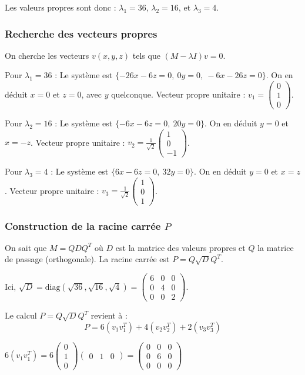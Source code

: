 \documentclass[french]{yLectureNote}
\begin{document}
Les valeurs propres sont donc : $\lambda_1 = 36$, $\lambda_2 = 16$, et $\lambda_3 = 4$.

 \subsubsection{Recherche des vecteurs propres}
On cherche les vecteurs $v(x, y, z)$ tels que $(M - \lambda I)v = 0$.

   Pour $\lambda_1 = 36$ :
    Le système est $\{-26x - 6z = 0, \ 0y = 0, \ -6x - 26z = 0\}$. On en déduit $x=0$ et $z=0$, avec $y$ quelconque.
    Vecteur propre unitaire : $v_1 = \begin{pmatrix} 0 \\ 1 \\ 0 \end{pmatrix}$.

   Pour $\lambda_2 = 16$ :
    Le système est $\{-6x - 6z = 0, \ 20y = 0\}$. On en déduit $y=0$ et $x = -z$.
    Vecteur propre unitaire : $v_2 = \frac{1}{\sqrt{2}} \begin{pmatrix} 1 \\ 0 \\ -1 \end{pmatrix}$.

   Pour $\lambda_3 = 4$ :
    Le système est $\{6x - 6z = 0, \ 32y = 0\}$. On en déduit $y=0$ et $x = z$.
    Vecteur propre unitaire : $v_3 = \frac{1}{\sqrt{2}} \begin{pmatrix} 1 \\ 0 \\ 1 \end{pmatrix}$.

\subsubsection{Construction de la racine carrée $P$}
On sait que $M = Q D Q^T$ où $D$ est la matrice des valeurs propres et $Q$ la matrice de passage (orthogonale). La racine carrée est $P = Q \sqrt{D} Q^T$.

Ici, $\sqrt{D} = \text{diag}(\sqrt{36}, \sqrt{16}, \sqrt{4}) = \begin{pmatrix} 6 & 0 & 0 \\ 0 & 4 & 0 \\ 0 & 0 & 2 \end{pmatrix}$.

Le calcul $P = Q \sqrt{D} Q^T$ revient à :
$$P = 6(v_1 v_1^T) + 4(v_2 v_2^T) + 2(v_3 v_3^T)$$

   $6(v_1 v_1^T) = 6 \begin{pmatrix} 0 \\ 1 \\ 0 \end{pmatrix} \begin{pmatrix} 0 & 1 & 0 \end{pmatrix} = \begin{pmatrix} 0 & 0 & 0 \\ 0 & 6 & 0 \\ 0 & 0 & 0 \end{pmatrix}$
\end{document}

